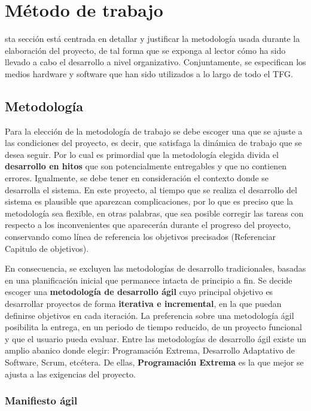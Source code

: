 \chapter{Método de trabajo}
\label{chap:metodo}

sta sección está centrada en detallar y justificar la metodología usada durante la elaboración del proyecto, de tal forma que se exponga al lector cómo ha sido llevado a cabo el desarrollo a nivel organizativo. Conjuntamente, se especifican los medios hardware y software que han sido utilizados a lo largo de todo el \acs{TFG}.

\section{Metodología}
\label{sec:metodologia}

Para la elección de la metodología de trabajo se debe escoger una que se ajuste a las condiciones del proyecto, es decir, que satisfaga la dinámica de trabajo que se desea seguir. Por lo cual es primordial que la metodología elegida divida el \textbf{desarrollo en hitos} que son potencialmente entregables y que no contienen errores. Igualmente, se debe tener en consideración el contexto donde se desarrolla el sistema. En este proyecto, al tiempo que se realiza el desarrollo del sistema es plausible que aparezcan complicaciones, por lo que es preciso que la metodología sea flexible, en otras palabras, que sea posible corregir las tareas con respecto a los inconvenientes que aparecerán durante el progreso del proyecto, conservando como línea de referencia los objetivos precisados (Referenciar Capitulo de objetivos).

En consecuencia, se excluyen las metodologías de desarrollo tradicionales, basadas en una planificación inicial que permanece intacta de principio a fin. Se decide escoger una \textbf{metodología de desarrollo ágil} cuyo principal objetivo es desarrollar proyectos de forma \textbf{iterativa e incremental}, en la que puedan definirse objetivos en cada iteración. La preferencia sobre una metodología ágil posibilita la entrega, en un periodo de tiempo reducido, de un proyecto funcional y que el usuario pueda evaluar. Entre las metodologías de desarrollo ágil existe un amplio abanico donde elegir: Programación Extrema, Desarrollo Adaptativo de Software, Scrum, etcétera. De ellas, \textbf{Programación Extrema} es la que mejor se ajusta a las exigencias del proyecto.

\subsection{Manifiesto ágil}
\label{sec:manifiestoagil}

